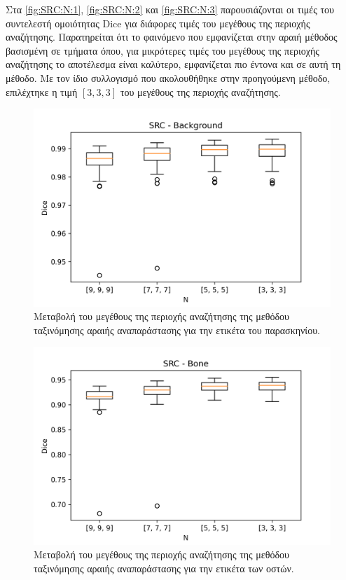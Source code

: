 \documentclass[a4paper,12pt]{article}
\begin{document}
Στα \autoref{fig:SRC:N:1}, \autoref{fig:SRC:N:2} και \autoref{fig:SRC:N:3}
παρουσιάζονται οι τιμές του συντελεστή ομοιότητας Dice για διάφορες τιμές του
μεγέθους της περιοχής αναζήτησης. Παρατηρείται ότι το φαινόμενο που εμφανίζεται
στην αραιή μέθοδος βασισμένη σε τμήματα όπου, για μικρότερες τιμές του μεγέθους
της περιοχής αναζήτησης το αποτέλεσμα είναι καλύτερο, εμφανίζεται πιο έντονα και
σε αυτή τη μέθοδο. Με τον ίδιο συλλογισμό που ακολουθήθηκε στην προηγούμενη
μέθοδο, επιλέχτηκε η τιμή $[3,3,3]$ του μεγέθους της περιοχής αναζήτησης.

\begin{figure}[H]
    \centering
    \includegraphics[width=0.85\linewidth]{SRC_N_Background_plot.png}
    \caption{Μεταβολή του μεγέθους της περιοχής αναζήτησης της μεθόδου
             ταξινόμησης αραιής αναπαράστασης για την ετικέτα του παρασκηνίου.}
    \label{fig:SRC:N:1}
\end{figure}

\begin{figure}[H]
    \centering
    \includegraphics[width=0.85\linewidth]{SRC_N_Bone_plot.png}
    \caption{Μεταβολή του μεγέθους της περιοχής αναζήτησης της μεθόδου
             ταξινόμησης αραιής αναπαράστασης για την ετικέτα των οστών.}
    \label{fig:SRC:N:2}
\end{figure}
\end{document}
